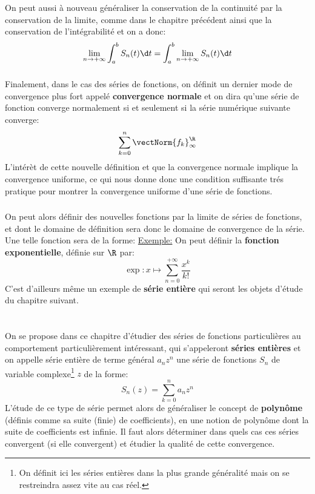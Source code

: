On peut aussi à nouveau généraliser la conservation de la continuité par la conservation de la limite, comme dans le chapitre précédent ainsi que la conservation de l'intégrabilité et on a donc:
\[
   \lim_{n \rightarrow +\infty}\int_{a}^{b} S_n(t) \d t = \int_{a}^{b} \lim_{n \rightarrow +\infty} S_n(t) \d t
\]
\pagebreak
\subsection*{}
Finalement, dans le cas des séries de fonctions, on définit un dernier mode de convergence plus fort appelé \textbf{convergence normale} et on dira qu'une série de fonction converge normalement si et seulement si la série numérique suivante converge:
\[
   \sum_{k=0}^{n} \vectNorm{f_k}_\infty^\R   
\]
L'intérèt de cette nouvelle définition et que la convergence normale implique la convergence uniforme, ce qui nous donne donc une condition suffisante trés pratique pour montrer la convergence uniforme d'une série de fonctions.

\subsection*{}
On peut alors définir des nouvelles fonctions par la limite de séries de fonctions, et dont le domaine de définition sera donc le domaine de convergence de la série. Une telle fonction sera de la forme:
\underline{Exemple:} On peut définir la \textbf{fonction exponentielle}, définie sur \(\R\) par:
\[
   \exp: x \mapsto \sum_{n=0}^{+\infty} \frac{x^k}{k!}
\]
C'est d'ailleurs même un exemple de \textbf{série entière} qui seront les objets d'étude du chapitre suivant.

\chapter*{}
On se propose dans ce chapitre d'étudier des séries de fonctions particulières au comportement particulièrement intéressant, qui s'appeleront \textbf{séries entières} et on appelle série entière de terme général \(a_nz^n\) une série de fonctions \(S_n\) de variable complexe\footnote[1]{On définit ici les séries entières dans la plus grande généralité mais on se restreindra assez vite au cas réel.} \(z\) de la forme:
\[
   S_n(z) = \sum_{k=0}^{n} a_nz^n 
\]
L'étude de ce type de série permet alors de généraliser le concept de \textbf{polynôme} (définis comme sa suite (finie) de coefficients), en une notion de polynôme dont la suite de coefficients est infinie. Il faut alors déterminer dans quels cas ces séries convergent (si elle convergent) et étudier la qualité de cette convergence.

